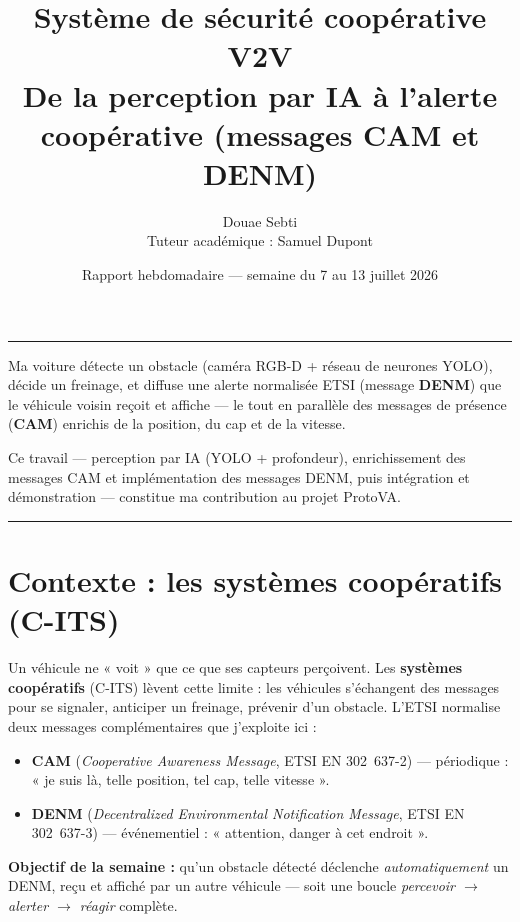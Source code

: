 \documentclass[a4paper,11pt]{article}
\title{\textbf{Système de sécurité coopérative V2V}\\[5pt]
  {\large\mdseries De la perception par IA à l'alerte coopérative (messages CAM et DENM)}}
\author{Douae Sebti \\[2pt] {\small Tuteur académique : Samuel Dupont}}
\date{Rapport hebdomadaire --- semaine du 7 au 13 juillet 2026}
\begin{document}
\maketitle
\vspace{-2pt}
\begin{center}\rule{0.96\textwidth}{0.4pt}\end{center}
\vspace{3pt}

\begin{contrib}
Ma voiture détecte un obstacle (caméra RGB-D + réseau de neurones YOLO), décide un freinage, et
diffuse une alerte normalisée ETSI (message \textbf{DENM}) que le véhicule voisin reçoit et
affiche --- le tout en parallèle des messages de présence (\textbf{CAM}) enrichis de la position,
du cap et de la vitesse.
\end{contrib}

\begin{contrib}[Ma contribution]
Ce travail --- perception par IA (YOLO + profondeur), enrichissement des messages CAM et
implémentation des messages DENM, puis intégration et démonstration --- constitue ma contribution
au projet ProtoVA.
\end{contrib}

\tableofcontents
\vspace{4pt}
\begin{center}\rule{0.96\textwidth}{0.4pt}\end{center}

\section{Contexte : les systèmes coopératifs (C-ITS)}
Un véhicule ne « voit » que ce que ses capteurs perçoivent. Les \textbf{systèmes coopératifs}
(C-ITS) lèvent cette limite : les véhicules s'échangent des messages pour se signaler, anticiper
un freinage, prévenir d'un obstacle. L'ETSI normalise deux messages complémentaires que
j'exploite ici :
\begin{itemize}[leftmargin=1.5em, itemsep=1pt]
  \item \textbf{CAM} (\emph{Cooperative Awareness Message}, ETSI EN 302~637-2) --- périodique :
        « je suis là, telle position, tel cap, telle vitesse ».
  \item \textbf{DENM} (\emph{Decentralized Environmental Notification Message}, ETSI EN 302~637-3)
        --- événementiel : « attention, danger à cet endroit ».
\end{itemize}
\textbf{Objectif de la semaine :} qu'un obstacle détecté déclenche \emph{automatiquement} un
DENM, reçu et affiché par un autre véhicule --- soit une boucle \emph{percevoir $\to$ alerter
$\to$ réagir} complète.
\end{document}
